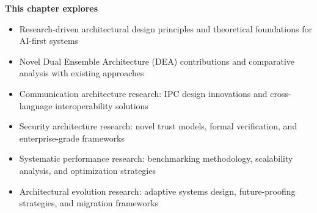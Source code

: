 \begin{tcolorbox}[
    enhanced,
    colback=white,
    colframe=brandPrimary!40,
    boxrule=1pt,
    arc=12pt,
    drop shadow={brandPrimary!20},
    left=1.5cm,
    right=1.5cm,
    top=1.2cm,
    bottom=1.2cm,
    before upper={\parindent0pt}
]
\begin{center}
{\Large\textbf{\textcolor{brandPrimary}{This chapter explores}}}
\end{center}

\vspace{0.8cm}

\begin{itemize}[leftmargin=1.2cm, itemsep=0.4cm, label={\textcolor{brandAccent}{$\triangleright$}}]
    \item {\large Research-driven architectural design principles and theoretical foundations for AI-first systems}
    \item {\large Novel Dual Ensemble Architecture (DEA) contributions and comparative analysis with existing approaches}
    \item {\large Communication architecture research: IPC design innovations and cross-language interoperability solutions}
    \item {\large Security architecture research: novel trust models, formal verification, and enterprise-grade frameworks}
    \item {\large Systematic performance research: benchmarking methodology, scalability analysis, and optimization strategies}
    \item {\large Architectural evolution research: adaptive systems design, future-proofing strategies, and migration frameworks}
\end{itemize}
\end{tcolorbox}

\clearpage
